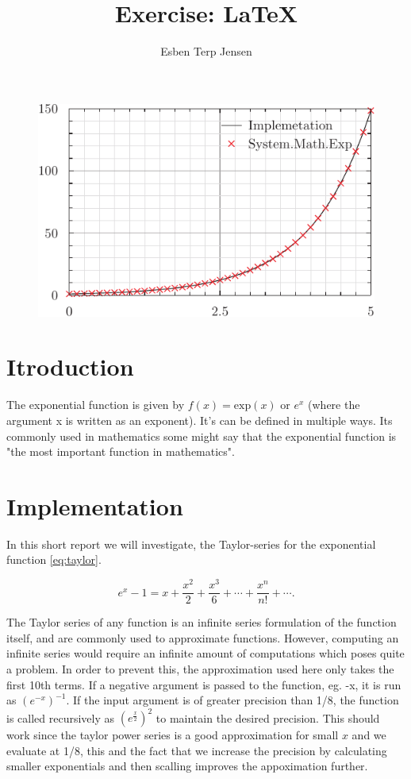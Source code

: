 \documentclass[12pt]{article}
\begin{document}
\title{Exercise: \LaTeX}
\author{Esben Terp Jensen}

\maketitle

\begin{figure}[H] \label{fig:ex}
	\includegraphics[width=\linewidth]{explot.pdf}
\end{figure}

\section{Itroduction}

The exponential function is given by $f(x)=\text{exp}(x)$ or $e^{x}$ (where the argument x is written as an exponent). It's can be defined in multiple ways. Its commonly used in mathematics some might say that the exponential function is "the most important function in mathematics". 

\section*{Implementation}

In this short report we will investigate, the Taylor-series for the exponential function \eqref{eq:taylor}.  

\begin{equation} \label{eq:taylor}
	e^x-1=x+\frac {x^2}2 + \frac{x^3}6+\cdots +\frac{x^n}{n!}+\cdots.	
\end{equation}

The Taylor series of any function is an infinite series formulation of the function itself, and are commonly used to approximate functions. However, computing an infinite series would require an infinite amount of computations which poses quite a problem. In order to prevent this, the approximation used here only takes the first 10th terms. If a negative argument is passed to the function, eg. -x, it is run as $(e^{-x})^{-1}$. If the input argument is of greater precision than 1/8, the function is called recursively as $(e^{\frac{x}{2}})^2$ to maintain the desired precision. This should work since the taylor power series is a good approximation for small $x$ and we evaluate at 1/8, this and the fact that we increase the precision by calculating smaller exponentials and then scalling improves the appoximation further.
\end{document}
